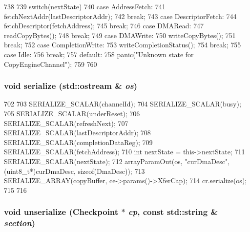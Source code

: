 \begin{DoxyCode}
738 {
739     switch(nextState) {
740       case AddressFetch:
741         fetchNextAddr(lastDescriptorAddr);
742         break;
743       case DescriptorFetch:
744         fetchDescriptor(fetchAddress);
745         break;
746       case DMARead:
747         readCopyBytes();
748         break;
749       case DMAWrite:
750         writeCopyBytes();
751         break;
752       case CompletionWrite:
753         writeCompletionStatus();
754         break;
755       case Idle:
756         break;
757       default:
758         panic("Unknown state for CopyEngineChannel\n");
759     }
760 }
\end{DoxyCode}
\hypertarget{classCopyEngine_1_1CopyEngineChannel_a53e036786d17361be4c7320d39c99b84}{
\subsubsection[{serialize}]{\setlength{\rightskip}{0pt plus 5cm}void serialize (std::ostream \& {\em os})}}
\label{classCopyEngine_1_1CopyEngineChannel_a53e036786d17361be4c7320d39c99b84}



\begin{DoxyCode}
702 {
703     SERIALIZE_SCALAR(channelId);
704     SERIALIZE_SCALAR(busy);
705     SERIALIZE_SCALAR(underReset);
706     SERIALIZE_SCALAR(refreshNext);
707     SERIALIZE_SCALAR(lastDescriptorAddr);
708     SERIALIZE_SCALAR(completionDataReg);
709     SERIALIZE_SCALAR(fetchAddress);
710     int nextState = this->nextState;
711     SERIALIZE_SCALAR(nextState);
712     arrayParamOut(os, "curDmaDesc", (uint8_t*)curDmaDesc, sizeof(DmaDesc));
713     SERIALIZE_ARRAY(copyBuffer, ce->params()->XferCap);
714     cr.serialize(os);
715 
716 }
\end{DoxyCode}
\hypertarget{classCopyEngine_1_1CopyEngineChannel_af22e5d6d660b97db37003ac61ac4ee49}{
\subsubsection[{unserialize}]{\setlength{\rightskip}{0pt plus 5cm}void unserialize ({\bf Checkpoint} $\ast$ {\em cp}, \/  const std::string \& {\em section})}}
\label{classCopyEngine_1_1CopyEngineChannel_af22e5d6d660b97db37003ac61ac4ee49}



